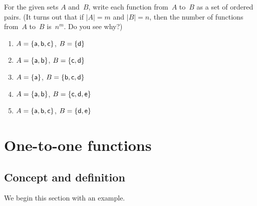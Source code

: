 \begin{exercise}{27}
 For the given sets $A$ and~$B$,
write each function from~$A$ to~$B$ as a set of ordered pairs. (It turns out that if $|A| = m$
and $|B| = n$, then the number of functions from~$A$ to~$B$ is~$n^m$. Do you see why?)
\begin{multicols}{2}
\begin{enumerate}
\item \label{FunctionsChapExers-FindAll-abc,d}
$A = \{\sf{a},\sf{b},\sf{c}\}$, $B = \{\sf{d}\}$
\item \label{FunctionsChapExers-FindAll-ab,cd}
$A = \{\sf{a},\sf{b}\}$, $B = \{\sf{c},\sf{d}\}$
\item \label{FunctionsChapExers-FindAll-a,bcd}
$A = \{\sf{a}\}$, $B = \{\sf{b},\sf{c},\sf{d}\}$
\item \label{FunctionsChapExers-FindAll-ab,cde}
$A = \{\sf{a},\sf{b}\}$, $B = \{\sf{c},\sf{d},\sf{e}\}$
\item $A = \{\sf{a},\sf{b},\sf{c}\}$, $B = \{\sf{d},\sf{e}\}$
\end{enumerate}
\end{multicols}
\end{exercise}



\section{One-to-one functions \quad {}} \label{onetoone}

\subsection{Concept and definition}

\medskip\noindent
We begin this section with an example.

